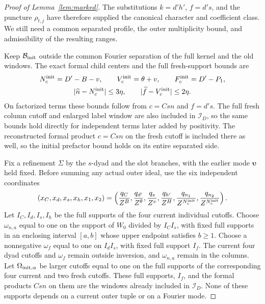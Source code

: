 \documentclass[11pt,a4paper]{article}
\numberwithin{equation}{section}
\numberwithin{figure}{section}
\theoremstyle{definition}
\theoremstyle{remark}
\begin{document}
\begin{proof}[Proof of Lemma~\ref{lem:marked}]
The substitutions \(k=d'h'\), \(f=d's\), and the puncture
\(\rho_{t,j}\) have therefore supplied the canonical character and
coefficient class.  We still need a common separated profile, the
outer multiplicity bound, and admissibility of the resulting ranges.

Keep \(\mathcal B_{\rm init}\) outside the common Fourier separation
of the full kernel and the old windows.  The exact
formal child centers and the full fresh-support bounds are
\begin{equation}\label{eq:initial-canonical-lengths}
 \begin{gathered}
 N_c^{\rm init}=D'-B-v,\qquad V_c^{\rm init}=\theta+v,\qquad
 F_c^{\rm init}=D'-P_1,\\
 |\widehat n-N_c^{\rm init}|\le3\eta,\qquad
 |\widehat f-V_c^{\rm init}|\le2\eta.
 \end{gathered}
\end{equation}
On factorized terms these bounds follow from \(c=Csn\) and \(f=d's\).
The full fresh column cutoff and enlarged label window are also included
in \(\mathcal I_D\), so the same bounds hold directly for independent
terms later added by positivity.  The reconstructed formal product
\(c=Csn\) on the fresh cutoff is included there as well, so the initial
prefactor bound holds on its entire separated side.

Fix a refinement \(\Sigma\) by the \(s\)-dyad and the slot branches,
with the earlier mode \(\boldsymbol\upsilon\) held fixed.  Before
summing any actual outer ideal, use the six independent coordinates
\[
 (x_C,x_d,x_s,x_h,x_1,x_2)
 =\left(\frac{q_C}{Z^B},\frac{q_{d'}}{Z^\theta},
 \frac{q_s}{Z^v},\frac{q_{h'}}{Z^H},
 \frac{q_{n_1}}{Z^{N_c^{\rm init}}},
 \frac{q_{n_2}}{Z^{N_c^{\rm init}}}\right).
\]
Let \(I_C,I_d,I_s,I_h\) be the full supports of the four current
individual cutoffs.  Choose \(\omega_{n,a}\) equal to one on the
support of \(W_0\) divided by \(I_CI_s\), with fixed full supports
in an enclosing interval \([a,b]\) whose upper endpoint satisfies
\(b\ge1\).  Choose a nonnegative \(\omega_f\) equal to one on
\(I_dI_s\), with fixed full support \(I_f\).  The current four dyad
cutoffs and \(\omega_f\) remain outside inversion, and
\(\omega_{n,a}\) remain in the columns.  Let
\(\Omega_{{\rm init},\alpha}\) be larger cutoffs equal to one on the
full supports of the corresponding four current and two fresh cutoffs.
These full supports, \(I_f\), and the formal products \(Csn\) on them
are the windows already included in \(\mathcal I_D\).  None of these
supports depends on a current outer tuple or on a Fourier mode.


\end{proof}
\end{document}
